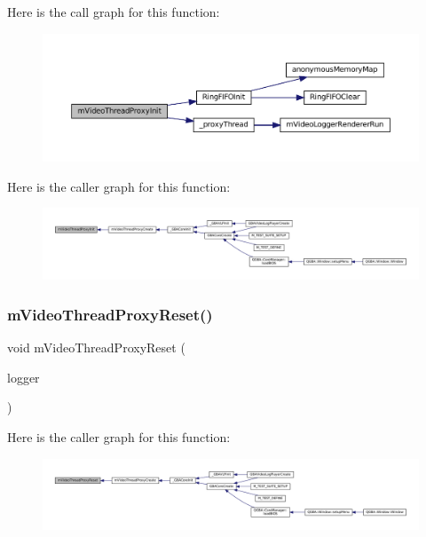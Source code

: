Here is the call graph for this function\+:
\nopagebreak
\begin{figure}[H]
\begin{center}
\leavevmode
\includegraphics[width=350pt]{thread-proxy_8c_a6af434b062813108e9046e2742ef9d15_cgraph}
\end{center}
\end{figure}
Here is the caller graph for this function\+:
\nopagebreak
\begin{figure}[H]
\begin{center}
\leavevmode
\includegraphics[width=350pt]{thread-proxy_8c_a6af434b062813108e9046e2742ef9d15_icgraph}
\end{center}
\end{figure}
\mbox{\label{thread-proxy_8c_aab76cb56b20c81f5a6bc984c29af7ca8}} 
\subsubsection{\texorpdfstring{m\+Video\+Thread\+Proxy\+Reset()}{mVideoThreadProxyReset()}}
{\footnotesize\ttfamily void m\+Video\+Thread\+Proxy\+Reset (\begin{DoxyParamCaption}\item[{struct m\+Video\+Logger $\ast$}]{logger }\end{DoxyParamCaption})\hspace{0.3cm}{\ttfamily [static]}}

Here is the caller graph for this function\+:
\nopagebreak
\begin{figure}[H]
\begin{center}
\leavevmode
\includegraphics[width=350pt]{thread-proxy_8c_aab76cb56b20c81f5a6bc984c29af7ca8_icgraph}
\end{center}
\end{figure}
